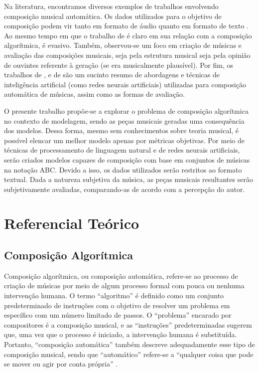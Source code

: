 \documentclass{automatextcc}
\begin{document}
Na literatura, encontramos diversos exemplos de trabalhos envolvendo composição musical automática. Os dados utilizados para o objetivo de composição podem vir tanto em formato de áudio \citep[como o de][]{kuang2021} quanto em formato de texto \citep[como o de][]{agarwala2017}. Ao mesmo tempo em que o trabalho de \citet{colombo2016} é claro em sua relação com a composição algorítmica, \citet{souza2018} é evasivo. Também, observou-se um foco em criação de músicas e avaliação das composições musicais, seja pela estrutura musical seja pela opinião de ouvintes referente à geração (se era musicalmente plausível). Por fim, os trabalhos de \citet{fernandez2013}, \citet{ji2020} e de \citet{olivan2021} são um sucinto resumo de abordagens e técnicas de inteligência artificial (como redes neurais artificiais) utilizadas para composição automática de músicas, assim como as formas de avaliação. 

O presente trabalho propõe-se a explorar o problema de composição algorítmica no contexto de modelagem, sendo as peças musicais geradas uma consequência dos modelos. Dessa forma, mesmo sem conhecimentos sobre teoria musical, é possível elencar um melhor modelo apenas por métricas objetivas. Por meio de técnicas de processamento de linguagem natural e de redes neurais artificiais, serão criados modelos capazes de composição com base em conjuntos de músicas na notação ABC. Devido a isso, os dados utilizados serão restritos ao formato textual. Dada a natureza subjetiva da música, as peças musicais resultantes serão subjetivamente avaliadas, comparando-as de acordo com a percepção do autor.



\chapter{Referencial Teórico}

\section{Composição Algorítmica}
Composição algorítmica, ou composição automática, refere-se ao processo de criação de músicas por meio de algum processo formal com pouca ou nenhuma intervenção humana. O termo ``algoritmo'' é definido como um conjunto predeterminado de instruções com o objetivo de resolver um problema em específico com um número limitado de passos. O ``problema'' encarado por compositores é a composição musical, e as ``instruções'' predeterminadas sugerem que, uma vez que o processo é iniciado, a intervenção humana é substituída. Portanto, ``composição automática'' também descreve adequadamente esse tipo de composição musical, sendo que ``automático'' refere-se a ``qualquer coisa que pode se mover ou agir por conta própria'' \citep{alpern1995, maurer}.
\end{document}
